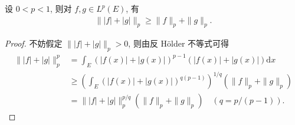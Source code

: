\documentclass[../../main.tex]{subfiles}%
\begin{document}
\begin{theorem}\label{theorem:反向Minkowski不等式}
设 $0<p<1$, 则对 $f,g\in L^p(E)$, 有
\begin{align*}
\||f|+|g|\|_p \geqslant \|f\|_p + \|g\|_p.
\end{align*}
\end{theorem}
\begin{proof}

不妨假定 $\||f|+|g|\|_p>0$, 则由反 Hölder 不等式可得
\begin{align*}
\||f|+|g|\|_p^p &= \int_E (|f(x)|+|g(x)|)^{p-1} (|f(x)|+|g(x)|) \mathrm{d}x \\
&\geqslant \left( \int_E (|f(x)|+|g(x)|)^{q(p-1)} \right)^{1/q} (\|f\|_p + \|g\|_p) \\
&= \||f|+|g|\|_p^{p/q} (\|f\|_p + \|g\|_p) \quad (q=p/(p-1)).
\end{align*}

\end{proof}
\end{document}
